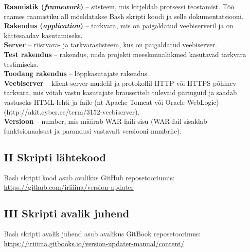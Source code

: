 \documentclass[12pt]{report}
\begin{document}
  \textbf{Raamistik (\textit{framework})} \--- süsteem, mis kirjeldab protsessi teostamist. Töö raames raamistiku all mõeldatakse Bash skripti koodi ja selle dokumentatsiooni.\\
  
  \textbf{Rakendus (\textit{application})} \--- tarkvara, mis on paigaldatud veebiserveril ja on kättesaadav kasutamiseks.\\
  
  \textbf{Server} \--- riistvara- ja tarkvarasüsteem, kus on paigaldatud veebiserver.\\
  
  \textbf{Test rakendus} \--- rakendus, mida projekti meeskonnaliikmed kasutavad tarkvara testimiseks.\\
   
  \textbf{Toodang rakendus} \--- lõppkasutajate rakendus.\\
  
  \textbf{Veebiserver} \--- klient-server-mudelil ja protokollil HTTP või HTTPS põhinev tarkvara, mis võtab vastu kasutajate brauseritelt tulevaid päringuid ja saadab vastuseks HTML-lehti ja faile (nt Apache Tomcat või Oracle WebLogic) (http://akit.cyber.ee/term/3152-veebiserver).\\
  
  \textbf{Versioon} \--- number, mis määrab WAR\--faili sisu (WAR\--fail sisaldab funktsionaalsust ja parandusi vastavalt versiooni numbrile).\\
  
  \subsection*{II Skripti lähtekood}
  \label{source-code}
  
  Bash skripti kood asub avalikus GitHub reposetooriumis:\\
  \url{https://github.com/iriiiina/version-updater}
  
  \subsection*{III Skripti avalik juhend}
  \label{public-documentation}
  
  Bash skripti avalik juhend asub avalikus GitBook reposetoorimus:\\
  \url{https://iriiiina.gitbooks.io/version-updater-manual/content/}
  
\end{document}

